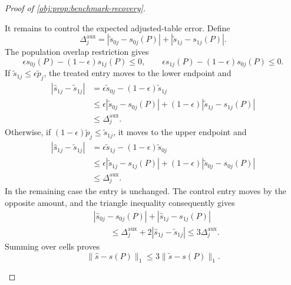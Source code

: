 \begin{proof}[Proof of \cref{obj:prop:benchmark-recovery}]
\begin{enumerate}
It remains to control the expected adjusted-table error. Define
\[
\Delta_j^{\mathrm{aux}}
=
|\widetilde s_{0j}-s_{0j}(P)|
+|\widetilde s_{1j}-s_{1j}(P)|.
\]
The population overlap restriction gives
\[
\epsilon s_{0j}(P)-(1-\epsilon)s_{1j}(P)\le0,
\qquad
\epsilon s_{1j}(P)-(1-\epsilon)s_{0j}(P)\le0.
\]
If \(\widetilde s_{1j}\le\epsilon\widetilde p_j\), the treated entry moves to the lower endpoint and
\[
\begin{aligned}
|\widehat s_{1j}-\widetilde s_{1j}|
&=\epsilon\widetilde s_{0j}-(1-\epsilon)\widetilde s_{1j}\\
&\le
\epsilon|\widetilde s_{0j}-s_{0j}(P)|
+(1-\epsilon)|\widetilde s_{1j}-s_{1j}(P)|\\
&\le\Delta_j^{\mathrm{aux}}.
\end{aligned}
\]
Otherwise, if \((1-\epsilon)\widetilde p_j\le\widetilde s_{1j}\), it moves to the upper endpoint and
\[
\begin{aligned}
|\widehat s_{1j}-\widetilde s_{1j}|
&=\epsilon\widetilde s_{1j}-(1-\epsilon)\widetilde s_{0j}\\
&\le
\epsilon|\widetilde s_{1j}-s_{1j}(P)|
+(1-\epsilon)|\widetilde s_{0j}-s_{0j}(P)|\\
&\le\Delta_j^{\mathrm{aux}}.
\end{aligned}
\]
In the remaining case the entry is unchanged. The control entry moves by the opposite amount, and the triangle inequality consequently gives
\[
\begin{aligned}
&|\widehat s_{0j}-s_{0j}(P)|
+|\widehat s_{1j}-s_{1j}(P)|\\
&\qquad\le
\Delta_j^{\mathrm{aux}}
+2|\widehat s_{1j}-\widetilde s_{1j}|
\le3\Delta_j^{\mathrm{aux}}.
\end{aligned}
\]
Summing over cells proves
\[
\|\widehat s-s(P)\|_1
\le3\|\widetilde s-s(P)\|_1.
\]


\end{enumerate}
\end{proof}
